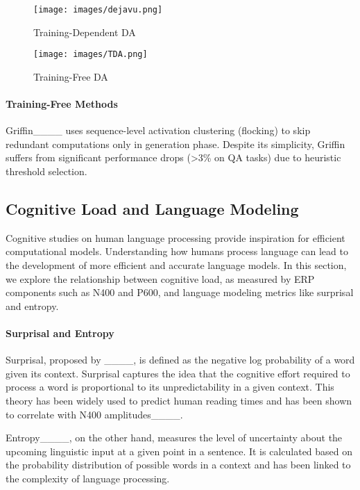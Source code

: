 \begin{figure*}[htbp]
    \begin{minipage}[t]{0.5\linewidth}
        \centering
        \texttt{[image: images/dejavu.png]}
        \caption{Training-Dependent DA}
        \label{figure:Training-Dependent DA}
    \end{minipage}
    \begin{minipage}[t]{0.5\linewidth}
        \centering
        \texttt{[image: images/TDA.png]}
        \caption{Training-Free DA}
        \label{figure:Training-Free TDA}
    \end{minipage}%
\end{figure*}
     
\paragraph{Training-Free Methods}
Griffin____ uses sequence-level activation clustering (flocking) to skip redundant computations only in generation phase. Despite its simplicity, Griffin suffers from significant performance drops (>3\% on QA tasks) due to heuristic threshold selection.

\subsection{Cognitive Load and Language Modeling}
Cognitive studies on human language processing provide inspiration for efficient computational models. Understanding how humans process language can lead to the development of more efficient and accurate language models. In this section, we explore the relationship between cognitive load, as measured by ERP components such as N400 and P600, and language modeling metrics like surprisal and entropy.

\paragraph{Surprisal and Entropy}
Surprisal, proposed by ____, is defined as the negative log probability of a word given its context. Surprisal captures the idea that the cognitive effort required to process a word is proportional to its unpredictability in a given context. This theory has been widely used to predict human reading times and has been shown to correlate with N400 amplitudes____.

Entropy____, on the other hand, measures the level of uncertainty about the upcoming linguistic input at a given point in a sentence. It is calculated based on the probability distribution of possible words in a context and has been linked to the complexity of language processing.
